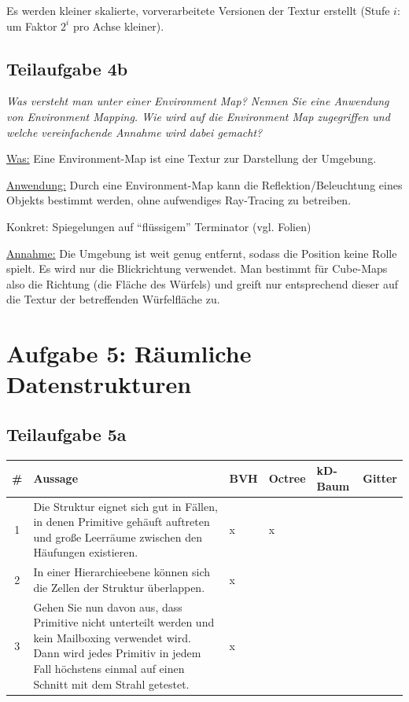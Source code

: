 \documentclass[a4paper]{scrartcl}
\begin{document}
Es werden kleiner skalierte, vorverarbeitete Versionen der Textur erstellt
(Stufe $i$: um Faktor $2^i$ pro Achse kleiner).

\subsection*{Teilaufgabe 4b}
\textit{Was versteht man unter einer Environment Map? Nennen Sie eine Anwendung
von Environment Mapping. Wie wird auf die Environment Map zugegriffen und
welche vereinfachende Annahme wird dabei gemacht?}

\underline{Was:} Eine Environment-Map ist eine Textur zur Darstellung der Umgebung.

\underline{Anwendung:} Durch eine Environment-Map kann die
Reflektion/Beleuchtung eines Objekts bestimmt werden, ohne aufwendiges
Ray-Tracing zu betreiben.

Konkret: Spiegelungen auf \enquote{flüssigem} Terminator (vgl. Folien)

\underline{Annahme:} Die Umgebung ist weit genug entfernt, sodass die Position
keine Rolle spielt. Es wird nur die Blickrichtung verwendet. Man bestimmt für
Cube-Maps also die Richtung (die Fläche des Würfels) und greift nur
entsprechend dieser auf die Textur der betreffenden Würfelfläche zu.

\section*{Aufgabe 5: Räumliche Datenstrukturen}
\subsection*{Teilaufgabe 5a}
\begin{tabular}{cp{8cm}llll}\toprule
\#& Aussage                                                                                                                                                                                                & BVH     & Octree & kD-Baum & Gitter \\\midrule
1 & Die Struktur eignet sich gut in Fällen, in denen Primitive gehäuft auftreten und große Leerräume zwischen den Häufungen existieren.                                                                    & x       & x      & ~       & ~      \\
2 & In einer Hierarchieebene können sich die Zellen der Struktur überlappen.                                                                                                                               & x       & ~      & ~       & ~      \\
3 & Gehen Sie nun davon aus, dass Primitive nicht unterteilt werden und kein Mailboxing verwendet wird. Dann wird jedes Primitiv in jedem Fall höchstens einmal auf einen Schnitt mit dem Strahl getestet. & x       & ~      & ~       & ~      \\\bottomrule
\end{tabular}
\end{document}
